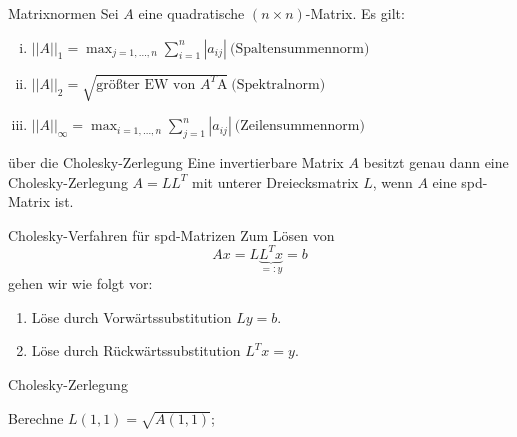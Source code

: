 \begin{flashcard}[Satz]{Matrixnormen}
Sei $A$ eine quadratische $(n \times n)$-Matrix. Es gilt:
\begin{enumerate}[(i)]
	\item $\displaystyle ||A||_1 = \max_{j=1,\ldots,n} \sum_{i=1}^n |a_{ij}| \ \text{(Spaltensummennorm)}$
	\item $\displaystyle ||A||_2 = \sqrt{\text{größter EW von $A^T$A}} \ \text{(Spektralnorm)}$
	\item $\displaystyle ||A||_\infty = \max_{i=1,\ldots,n} \sum_{j=1}^n |a_{ij}| \ \text{(Zeilensummennorm)}$
\end{enumerate}
\end{flashcard}

\begin{flashcard}[Satz]{über die Cholesky-Zerlegung}
Eine invertierbare Matrix $A$ besitzt genau dann eine Cholesky-Zerlegung $A = LL^T$ mit unterer Dreiecksmatrix $L$, wenn $A$ eine spd-Matrix ist.
\end{flashcard}

\begin{flashcard}[Algorithmus]{Cholesky-Verfahren für spd-Matrizen}
Zum Lösen von
$$Ax = L \underbrace{L^T x}_{=:y} = b$$
gehen wir wie folgt vor:
\begin{enumerate}
	\item Löse durch Vorwärtssubstitution $Ly = b$.
	\item Löse durch Rückwärtssubstitution $L^Tx = y$.
\end{enumerate}
\end{flashcard}

\begin{flashcard}[Algorithmus]{Cholesky-Zerlegung}
\begin{algorithm}[H]
	Berechne $L(1,1) = \sqrt{A(1,1)}$;\\
\end{algorithm}
\end{flashcard}